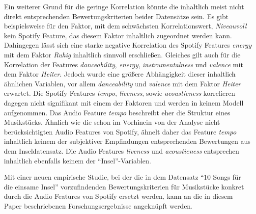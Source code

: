 Ein weiterer Grund für die geringe Korrelation könnte die inhaltlich meist nicht direkt entsprechenden Bewertungskriterien beider Datensätze sein.
Es gibt beispielsweise für den Faktor, mit dem schwächsten Korrelationswert, \textit{Niveauvoll} kein Spotify Feature, das diesem Faktor inhaltlich zugeordnet werden kann.
Dahingegen lässt sich eine starke negative Korrelation des Spotify Features \textit{energy} mit dem Faktor \textit{Ruhig} inhaltlich sinnvoll erschließen.
Gleiches gilt auch für die Korrelation der Features \textit{danceability}, \textit{energy}, \textit{instrumentalness} und \textit{valence} mit dem Faktor \textit{Heiter}.
Jedoch wurde eine größere Abhängigkeit dieser inhaltlich ähnlichen Variablen, vor allem \textit{danceability} und \textit{valence} mit dem Faktor \textit{Heiter} erwartet.
Die Spotify Features \textit{tempo}, \textit{liveness}, sowie \textit{acousticness} korrelieren dagegen nicht signifikant mit einem der Faktoren und werden in keinem Modell aufgenommen. 
Das Audio Feature \textit{tempo} beschreibt eher die Struktur eines Musikstücks.
Ähnlich wie die schon im Vorhinein von der Analyse nicht berücksichtigten Audio Features von Spotify, ähnelt daher das Feature \textit{tempo} inhaltlich keinem der subjektiver Empfindungen entsprechenden Bewertungen aus dem Inseldatensatz.
Die Audio Features \textit{liveness} und \textit{acousticness} entsprechen inhaltlich ebenfalls keinem der "`Insel"'-Variablen.  

Mit einer neuen empirische Studie, bei der die in dem Datensatz "`10 Songs für die einsame Insel"' vorzufindenden Bewertungskriterien für Musikstücke konkret durch die Audio Features von Spotify ersetzt werden, kann an die in diesem Paper beschriebenen Forschungsergebnisse angeknüpft werden.



